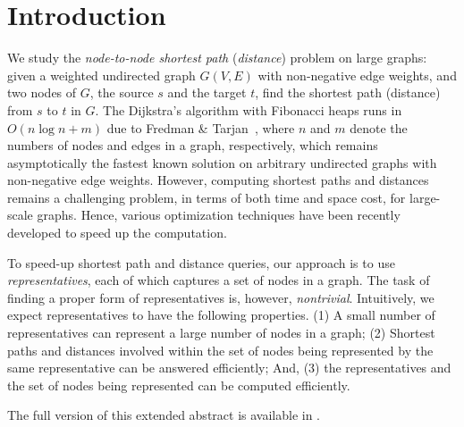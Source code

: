 \section{Introduction}
\label{sec-intro}


We study the {\em node-to-node shortest path} ({\em distance}) problem on large graphs: given a weighted undirected graph $G(V, E)$ with non-negative edge weights, and two nodes of $G$, the source $s$ and the target $t$, find the shortest path (distance) from $s$ to $t$ in $G$. 
The Dijkstra's algorithm with Fibonacci heaps runs in $O(n\log n + m)$ due to Fredman \& Tarjan~\cite{FredmanT84}, where $n$ and $m$ denote the numbers of nodes and edges in a graph, respectively, which remains asymptotically the fastest known solution on arbitrary undirected graphs with non-negative edge weights.
However, computing shortest  paths and distances remains a challenging problem, in terms of both time and space cost, for large-scale graphs. Hence, various optimization techniques have been recently developed to speed up the computation. %


To speed-up shortest  path and distance queries, our approach is to use {\em representatives}, each of which captures a set of nodes in a graph. The task of finding a proper form of representatives is, however, {\em nontrivial}. Intuitively, we expect representatives to have the following properties.
%
(1) A small number of representatives can represent a large number of nodes in a graph;
%
(2) Shortest paths and distances involved within the set of nodes being represented by the same representative can be answered efficiently; And,
%
(3) the representatives and the set of nodes being represented can be computed efficiently.

The full version of this extended abstract is available in \cite{journal-version2016}.

